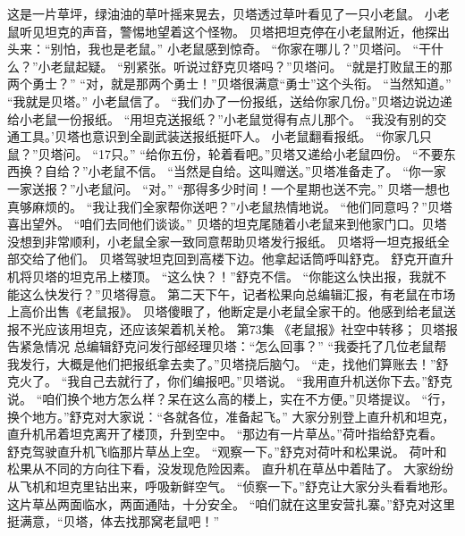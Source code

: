 \documentclass[a4paper,12pt,UTF8,twoside]{ctexbook}
\begin{document}
        这是一片草坪，绿油油的草叶摇来晃去，贝塔透过草叶看见了一只小老鼠。 
        小老鼠听见坦克的声音，警惕地望着这个怪物。 
        贝塔把坦克停在小老鼠附近，他探出头来：“别怕，我也是老鼠。” 
        小老鼠感到惊奇。 
        “你家在哪儿？”贝塔问。 
        “干什么？”小老鼠起疑。 
        “别紧张。听说过舒克贝塔吗？”贝塔问。 
        “就是打败鼠王的那两个勇士？” 
        “对，就是那两个勇士！”贝塔很满意“勇士”这个头衔。 
        “当然知道。” 
        “我就是贝塔。” 
        小老鼠信了。 
        “我们办了一份报纸，送给你家几份。”贝塔边说边递给小老鼠一份报纸。 
        “用坦克送报纸？”小老鼠觉得有点儿那个。 
        “我没有别的交通工具。’贝塔也意识到全副武装送报纸挺吓人。 
        小老鼠翻看报纸。 
        “你家几只鼠？”贝塔问。 
        “17只。” 
        “给你五份，轮着看吧。”贝塔又递给小老鼠四份。 
        “不要东西换？自给？”小老鼠不信。 
        “当然是自给。这叫赠送。”贝塔准备走了。 
        “你一家一家送报？”小老鼠问。 
        “对。” 
        “那得多少时间！一个星期也送不完。” 
        贝塔一想也真够麻烦的。 
        “我让我们全家帮你送吧？”小老鼠热情地说。 
        “他们同意吗？”贝塔喜出望外。 
        “咱们去同他们谈谈。” 
        贝塔的坦克尾随着小老鼠来到他家门口。贝塔没想到非常顺利，小老鼠全家一致同意帮助贝塔发行报纸。 
        贝塔将一坦克报纸全部交给了他们。 
        贝塔驾驶坦克回到高楼下边。他拿起话筒呼叫舒克。 
        舒克开直升机将贝塔的坦克吊上楼顶。 
        “这么快？！”舒克不信。 
        “你能这么快出报，我就不能这么快发行？”贝塔得意。 
        第二天下午，记者松果向总编辑汇报，有老鼠在市场上高价出售《老鼠报》。 
        贝塔傻眼了，他断定是小老鼠全家干的。他感到给老鼠送报不光应该用坦克，还应该架着机关枪。   第73集 
        《老鼠报》社空中转移； 
        贝塔报告紧急情况   
        总编辑舒克问发行部经理贝塔：“怎么回事？” 
        “我委托了几位老鼠帮我发行，大概是他们把报纸拿去卖了。”贝塔挠后脑勺。 
        “走，找他们算账去！”舒克火了。 
        “我自己去就行了，你们编报吧。”贝塔说。 
        “我用直升机送你下去。”舒克说。 
        “咱们换个地方怎么样？呆在这么高的楼上，实在不方便。”贝塔提议。 
        “行，换个地方。”舒克对大家说：“各就各位，准备起飞。” 
        大家分别登上直升机和坦克，直升机吊着坦克离开了楼顶，升到空中。 
        “那边有一片草丛。”荷叶指给舒克看。 
        舒克驾驶直升机飞临那片草丛上空。 
        “观察一下。”舒克对荷叶和松果说。 
        荷叶和松果从不同的方向往下看，没发现危险因素。 
        直升机在草丛中着陆了。 
        大家纷纷从飞机和坦克里钻出来，呼吸新鲜空气。 
        “侦察一下。”舒克让大家分头看看地形。 
        这片草丛两面临水，两面通陆，十分安全。 
        “咱们就在这里安营扎寨。”舒克对这里挺满意，“贝塔，体去找那窝老鼠吧！” 
\end{document}
